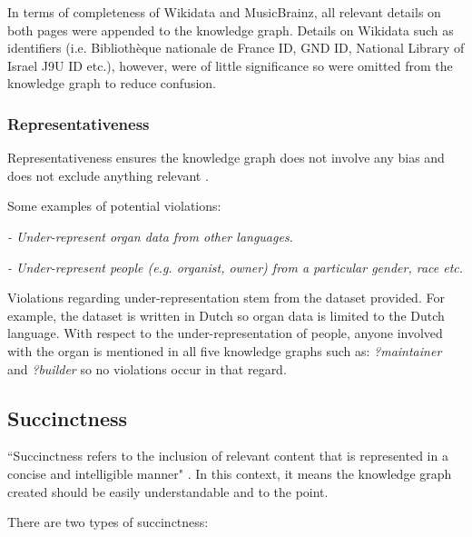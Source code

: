 In terms of completeness of Wikidata and MusicBrainz, all relevant details on both pages were appended to the knowledge graph. Details on Wikidata such as identifiers (i.e. Bibliothèque nationale de France ID, GND ID, National Library of Israel J9U ID etc.), however, were of little significance so were omitted from the knowledge graph to reduce confusion.

\subsubsection{Representativeness}
\hspace{0.5cm} Representativeness ensures the knowledge graph does not involve any bias and does not exclude anything relevant \cite{knowledgegraphevaulationbook}.

\noindent Some examples of potential violations: 

\vspace{-0.1cm}
\begin{displayquote}
    \textit{- Under-represent organ data from other languages.}
\end{displayquote}  
\vspace{-0.675cm}
\begin{displayquote}
     \textit{- Under-represent people (e.g. organist, owner) from a particular gender, race etc. }  
\end{displayquote}
\vspace{-0.1cm}

Violations regarding under-representation stem from the dataset provided. For example, the dataset is written in Dutch so organ data is limited to the Dutch language. With respect to the under-representation of people, anyone involved with the organ is mentioned in all five knowledge graphs such as: \textit{?maintainer} and \textit{?builder} so no violations occur in that regard.

\subsection{Succinctness}
\hspace{0.5cm} ``Succinctness refers to the inclusion of relevant content that is represented in a concise and intelligible manner" \cite{knowledgegraphevaulationbook}. In this context, it means the knowledge graph created should be easily understandable and to the point. 

\noindent There are two types of succinctness: 


